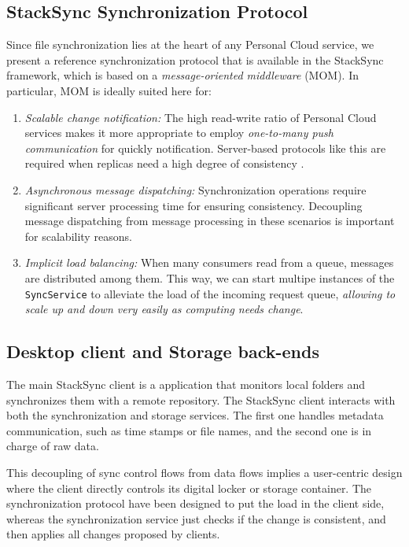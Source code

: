 \subsection{StackSync Synchronization Protocol}

Since file synchronization lies at the heart of any Personal Cloud service, 
we present a reference synchronization protocol that is available in the StackSync framework,
which is based on a \textit{message-oriented middleware} (MOM). In particular, 
MOM is ideally suited here for:

\begin{enumerate}
\item \textit{Scalable change notification:} The high read-write ratio of Personal Cloud services makes
it more appropriate to employ \textit{one-to-many push communication} for quickly notification.  
Server-based protocols like this are required when replicas need a high degree of consistency \cite{Tanenbaum:2001:DSP:559404}.
\item \textit{Asynchronous message dispatching:}  Synchronization operations require significant
server processing time for ensuring consistency. Decoupling message dispatching from message
processing in these scenarios  \cite{menasce2005mom} is important for scalability reasons.
\item \textit{Implicit load balancing:} When many consumers read from a queue, messages are
distributed among them. This way, we can start multipe
instances of the \texttt{SyncService} to alleviate the load of the incoming request queue,
\textit{allowing to scale up and down very easily as computing needs change}.
\end{enumerate}


\subsection{Desktop client and Storage back-ends}

The main StackSync client is a application that monitors local folders and synchronizes them with a remote repository. The StackSync client interacts with both the synchronization and storage services. The first one handles metadata communication, such as time stamps or file names, and the second one is in charge of raw data.


This decoupling of sync control flows from data flows implies a user-centric design where the client directly controls its digital locker or storage container. The synchronization protocol have been designed to put the load in the client side, whereas the synchronization service just
checks if the change is consistent, and then applies all changes proposed by clients.


